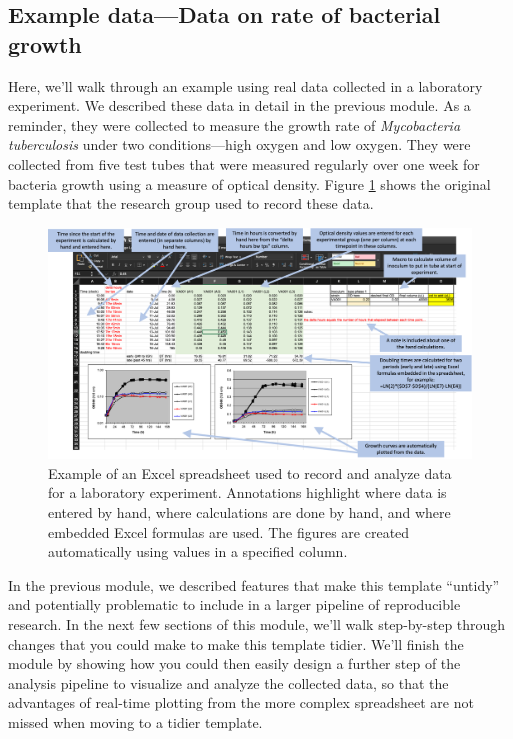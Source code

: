 \documentclass[]{tufte-book}
\begin{document}
\subsection{Example data---Data on rate of bacterial growth}\label{example-datadata-on-rate-of-bacterial-growth}

Here, we'll walk through an example using real data collected in a laboratory
experiment. We described these data in detail in the previous module. As a
reminder, they were collected to measure the growth rate of \emph{Mycobacteria
tuberculosis} under two conditions---high oxygen and low oxygen. They were
collected from five test tubes that were measured regularly over one week for
bacteria growth using a measure of optical density. Figure
\ref{fig:growthexcel2} shows the original template that the research group used
to record these data.

\begin{figure}
\includegraphics[width=\textwidth]{figures/growth_curve_example} \caption[Example of an Excel spreadsheet used to record and analyze data for a laboratory experiment]{Example of an Excel spreadsheet used to record and analyze data for a laboratory experiment. Annotations highlight where data is entered by hand, where calculations are done by hand, and where embedded Excel formulas are used. The figures are created automatically using values in a specified column.}\label{fig:growthexcel2}
\end{figure}

In the previous module, we described features that make this template ``untidy''
and potentially problematic to include in a larger pipeline of reproducible
research. In the next few sections of this module, we'll walk step-by-step
through changes that you could make to make this template tidier. We'll finish
the module by showing how you could then easily design a further step of the
analysis pipeline to visualize and analyze the collected data, so that the
advantages of real-time plotting from the more complex spreadsheet are not
missed when moving to a tidier template.
\end{document}

